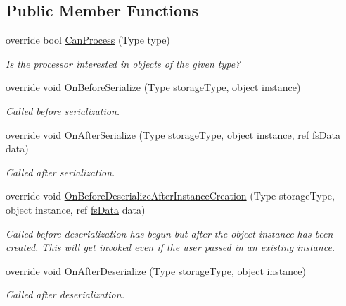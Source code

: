 \subsection*{Public Member Functions}
\begin{DoxyCompactItemize}
\item 
override bool \hyperlink{class_full_serializer_1_1_internal_1_1fs_serialization_callback_processor_a78a0e22235867c360c341f0772d506a1}{Can\+Process} (Type type)
\begin{DoxyCompactList}\small\item\em Is the processor interested in objects of the given type? \end{DoxyCompactList}\item 
override void \hyperlink{class_full_serializer_1_1_internal_1_1fs_serialization_callback_processor_adee2943e2bf0bacad3957dfb15b32de8}{On\+Before\+Serialize} (Type storage\+Type, object instance)
\begin{DoxyCompactList}\small\item\em Called before serialization. \end{DoxyCompactList}\item 
override void \hyperlink{class_full_serializer_1_1_internal_1_1fs_serialization_callback_processor_aec377284c9f2083c84dfdc75c70e628e}{On\+After\+Serialize} (Type storage\+Type, object instance, ref \hyperlink{class_full_serializer_1_1fs_data}{fs\+Data} data)
\begin{DoxyCompactList}\small\item\em Called after serialization. \end{DoxyCompactList}\item 
override void \hyperlink{class_full_serializer_1_1_internal_1_1fs_serialization_callback_processor_ae6668c0ebad8c39d4d0e145efa7fb332}{On\+Before\+Deserialize\+After\+Instance\+Creation} (Type storage\+Type, object instance, ref \hyperlink{class_full_serializer_1_1fs_data}{fs\+Data} data)
\begin{DoxyCompactList}\small\item\em Called before deserialization has begun but {\itshape after} the object instance has been created. This will get invoked even if the user passed in an existing instance. \end{DoxyCompactList}\item 
override void \hyperlink{class_full_serializer_1_1_internal_1_1fs_serialization_callback_processor_a18c88f0c5eb32dc01457fbbeaffe9f4a}{On\+After\+Deserialize} (Type storage\+Type, object instance)
\begin{DoxyCompactList}\small\item\em Called after deserialization. \end{DoxyCompactList}\end{DoxyCompactItemize}


